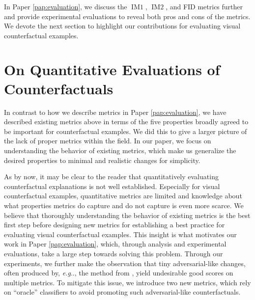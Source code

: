 \documentclass[11pt,a4paper,twoside,openright,final]{memoir}
\makeatletter
\DeclareRobustCommand\onedot{\futurelet\@let@token\@onedot}
\def\@onedot{\ifx\@let@token.\else.\null\fi\xspace}
\def\eg{\emph{e.g}\onedot} \def\Eg{\emph{E.g}\onedot}
\newcommand\contribution[1]{\hspace{0.5em}\hyperref[#1]{\ding{81}}}
\newcommand*{\paperref}[1]{Paper \hyperref[#1]{\ref{#1}}}
\makeatother
\begin{document}
In \paperref{pap:evaluation}, we discuss the $\operatorname{IM1}$, $\operatorname{IM2}$, and FID metrics further and provide experimental evaluations to reveal both pros and cons of the metrics.
We devote the next section to highlight our contributions for evaluating visual counterfactual examples. 

\section{On Quantitative Evaluations of Counterfactuals\contribution{pap:evaluation}}

In contrast to how we describe metrics in \paperref{pap:evaluation}, we have described existing metrics above in terms of the five properties broadly agreed to be important for counterfactual examples.
We did this to give a larger picture of the lack of proper metrics within the field. 
In our paper, we focus on understanding the behavior of existing metrics, which make us generalize the desired properties to minimal and realistic changes for simplicity. 

As by now, it may be clear to the reader that quantitatively evaluating counterfactual explanations is not well established.
Especially for visual counterfactual examples, quantitative metrics are limited and knowledge about what properties metrics do capture and do not capture is even more scarce.
We believe that thoroughly understanding the behavior of existing metrics is the best first step before designing new metrics for establishing a best practice for evaluating visual counterfactual examples.
This insight is what motivates our work in \paperref{pap:evaluation}, which, through analysis and experimental evaluations, take a large step towards solving this problem.
Through our experiments, we further make the observation that tiny adversarial-like changes, often produced by, \eg, the method from \cite{Wachter2017}, yield undesirable good scores on multiple metrics.
To mitigate this issue, we introduce two new metrics, which rely on ``oracle'' classifiers to avoid promoting such adversarial-like counterfactuals.
\end{document}
